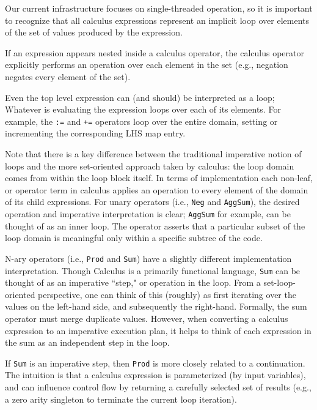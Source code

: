 \documentclass[11pt]{amsart}
\newcommand{\parsection}[1]{\smallskip\noindent{\bf #1.}}
\begin{document}
\parsection{Loops} 
Our current infrastructure focuses on single-threaded operation, so it is important to recognize that all calculus expressions represent an implicit loop over elements of the set of values produced by the expression.

If an expression appears nested inside a calculus operator, the calculus operator explicitly performs an operation over each element in the set (e.g., negation negates every element of the set).  

Even the top level expression can (and should) be interpreted as a loop; Whatever is evaluating the expression loops over each of its elements.  For example, the {\tt :=} and {\tt +=} operators loop over the entire domain, setting or incrementing the corresponding LHS map entry.

Note that there is a key difference between the traditional imperative notion of loops and the more set-oriented approach taken by calculus: the loop domain comes from within the loop block itself.  In terms of implementation each non-leaf, or operator term in calculus applies an operation to every element of the domain of its child expressions.  For unary operators (i.e., {\tt Neg} and {\tt AggSum}), the desired operation and imperative interpretation is clear; {\tt AggSum} for example, can be thought of as an inner loop.  The operator asserts that a particular subset of the loop domain is meaningful only within a specific subtree of the code.

N-ary operators (i.e., {\tt Prod} and {\tt Sum}) have a slightly different implementation interpretation.  Though Calculus is a primarily functional language, {\tt Sum} can be thought of as an imperative ``step," or operation in the loop.  From a set-loop-oriented perspective, one can think of this (roughly) as first iterating over the values on the left-hand side, and subsequently the right-hand.  Formally, the sum operator must merge duplicate values.  However, when converting a calculus expression to an imperative execution plan, it helps to think of each expression in the sum as an independent step in the loop.

\parsection{{\tt Prod} (and Singletons and Single-entry tables)}
If {\tt Sum} is an imperative step, then {\tt Prod} is more closely related to a continuation.  The intuition is that a calculus expression is parameterized (by input variables), and can influence control flow by returning a carefully selected set of results (e.g., a zero arity singleton to terminate the current loop iteration).  
\end{document}

